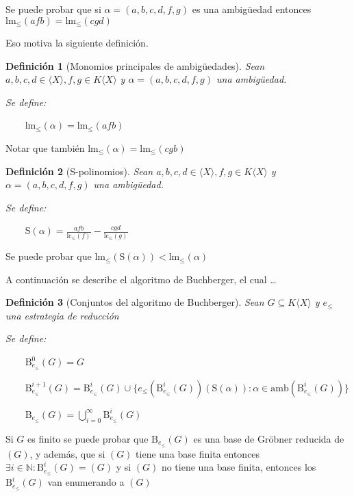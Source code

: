 \documentclass{amsbook}
\theoremstyle{customstyle}
\newtheorem{definition}{Definición}[section]
\newcommand{\definición}[2][]{
  \begin{definition}[#1]
  \setlength{\parindent}{2em} %
  #2
  \end{definition}
}
\begin{document}
Se puede probar que si $α = (a, b, c, d, f, g)$ es una ambigüedad entonces $\text{lm}_≤{(afb)} = \text{lm}_≤{(cgd)}$

Eso motiva la siguiente definición.

\definición[Monomios principales de ambigüedades] {
Sean $a, b, c, d ∈ ⟨X⟩, f, g ∈ K⟨X⟩$ y $α = (a, b, c, d, f, g)$ una ambigüedad.

Se define:

    $\text{lm}_≤{(α)} = \text{lm}_≤{(afb)}$
}
Notar que también $\text{lm}_≤{(α)} = \text{lm}_≤{(cgb)}$

\definición[S-polinomios] {
Sean $a, b, c, d ∈ ⟨X⟩, f, g ∈ K⟨X⟩$ y $α = (a, b, c, d, f, g)$ una ambigüedad.

Se define:

    $\text{S}(α) = \frac{afb}{\text{lc}_≤{(f)}} - \frac{cgd}{\text{lc}_≤{(g)}}$
}
Se puede probar que $\text{lm}_≤{(\text{S}(α))} < \text{lm}_≤{(α)}$


A continuación se describe el algoritmo de Buchberger, el cual … %

\definición[Conjuntos del algoritmo de Buchberger] {
Sean $G ⊆ K⟨X⟩$ y $e_≤$ una estrategia de reducción

Se define:

    $\text{B}_{e_≤}^0(G) = G$

    $\text{B}_{e_≤}^{i + 1}(G) = \text{B}_{e_≤}^i(G) ∪ \{e_≤(\text{B}_{e_≤}^i(G))(\text{S}(α)) : α ∈ \text{amb}(\text{B}_{e_≤}^i(G))\}$

    $\text{B}_{e_≤}(G) = \bigcup_{i = 0}^∞ \text{B}_{e_≤}^i(G)$

}

Si $G$ es finito se puede probar que $\text{B}_{e_≤}(G)$ es una base de Gröbner reducida de $(G)$, y además, que si $(G)$ tiene una base finita entonces $∃i ∈ ℕ : \text{B}_{e_≤}^i(G) = (G)$ y si $(G)$ no tiene una base finita, entonces los $\text{B}_{e_≤}^i(G)$ van enumerando a $(G)$


\end{document}
